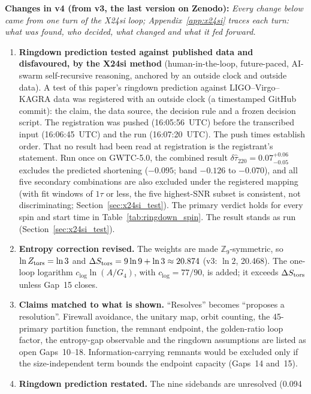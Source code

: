 \documentclass[11pt,a4paper]{article}
\begin{document}
\smallskip
\noindent\textbf{Changes in v4 (from v3, the last version on Zenodo):}
\noindent\textit{Every change below came from one turn of the X24si loop; Appendix~\ref{app:x24si}
traces each turn: what was found, who decided, what changed and what it fed forward.}
\begin{enumerate}[leftmargin=*, label=\textit{(\roman*)}, itemsep=1pt, topsep=2pt]
  \item \textbf{Ringdown prediction tested against published data and disfavoured, by
    the X24si method} (human-in-the-loop, future-paced, AI-swarm self-recursive reasoning,
    anchored by an outside clock and outside data). A test of this paper's ringdown
    prediction against LIGO--Virgo--KAGRA data was registered with an outside clock (a
    timestamped GitHub commit): the claim, the data source, the decision rule and a frozen
    decision script. The registration was pushed (16:05:56~UTC) before the transcribed input (16:06:45~UTC) and the run (16:07:20~UTC). The push times establish order. That no result had been read at registration is the registrant's statement. Run once on GWTC-5.0, the combined result
    $\delta\hat\tau_{220} = 0.07^{+0.06}_{-0.05}$ excludes the predicted shortening
    ($-0.095$; band $-0.126$ to $-0.070$), and all five secondary combinations are also excluded under the registered mapping (with fit windows of $1\tau$ or less, the five highest-SNR subset is consistent, not discriminating; Section~\ref{sec:x24si_test}). The primary verdict holds for every spin and start time in Table~\ref{tab:ringdown_spin}. The
    result stands as run (Section~\ref{sec:x24si_test}).
  \item \textbf{Entropy correction revised.} The weights are made $\mathbb{Z}_9$-symmetric,
    so $\ln Z_{\rm tors} = \ln 3$ and $\Delta S_{\rm tors} = 9\ln 9 + \ln 3 \approx 20.874$
    (v3: $\ln 2$, 20.468). The one-loop logarithm $c_{\log}\ln(A/G_4)$, with
    $c_{\log} = 77/90$, is added; it exceeds $\Delta S_{\rm tors}$ unless Gap~15 closes.
  \item \textbf{Claims matched to what is shown.} ``Resolves'' becomes ``proposes a
    resolution''. Firewall avoidance, the unitary map, orbit counting, the 45-primary
    partition function, the remnant endpoint, the golden-ratio loop factor, the entropy-gap
    observable and the ringdown assumptions are listed as open Gaps~10--18. Information-carrying remnants would be excluded only if the size-independent term bounds the endpoint capacity (Gaps~14 and~15).
  \item \textbf{Ringdown prediction restated.} The nine sidebands are unresolved (0.094

\end{enumerate}
\end{document}
